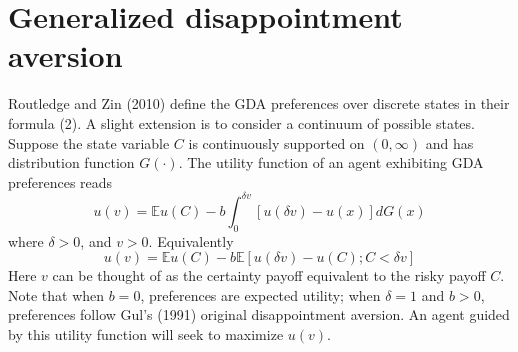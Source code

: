 \documentclass{article}
\newcommand{\E}{
  \mathbb{E}
}
\newcommand{\1}[1]{
  \mathbf{1}_{\{#1\}}
}
\begin{document}


\section{Generalized disappointment aversion}
\label{sec:GDA}
Routledge and Zin (2010) \cite{routledge2010generalized} define the GDA
preferences over discrete states in their formula (2). A slight extension
is to consider a continuum of possible states. Suppose the state variable
$C$ is continuously supported on $(0, \infty)$ and has distribution
function $G(\cdot)$. The utility function of an agent exhibiting GDA
preferences reads
\begin{equation}
  u(v)= \E u(C) - b \int_{0}^{\delta v}
  \left[ u(\delta v) - u(x) \right] dG(x)\label{11}%
\end{equation}
where $\delta > 0$, and $v>0$. Equivalently
\begin{equation}
  \label{eq:xxie0}
  u(v) = \E u(C) - b \E[u(\delta v) - u(C); C < \delta v]
\end{equation}
Here $v$ can be thought of as the certainty payoff equivalent to the
risky payoff $C$. Note that when $b=0$, 
preferences are expected utility; when $\delta=1$ and $b>0$,
preferences follow Gul's (1991) original disappointment aversion.
An agent guided by this utility function will seek to maximize $u(v)$.
\end{document}
